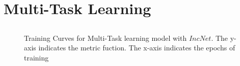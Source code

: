 \clearpage

\section{Multi-Task Learning}

\subsection{\texorpdfstring{}{TEXT}}
\label{MtlIncNet}
\begin{figure}[ht]

\caption{Training Curves for Multi-Task learning model with $IncNet$. The y-axis indicates the metric fuction. The x-axis indicates the epochs of training}
\label{MTLtraining}
\end{figure}

